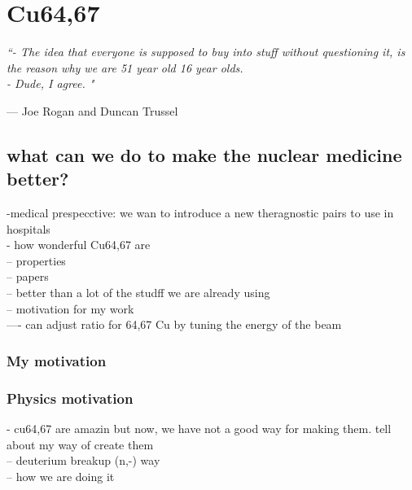 \documentclass[twoside,english]{uiofysmaster/uiofysmaster}
\begin{document}
\chapter{Cu64,67} 
\label{ch: mywork}

\epigraph{\itshape ``- The idea that everyone is supposed to buy into stuff without questioning it, is the reason why we are 51 year old 16 year olds.\\ 
- Dude, I agree. "}{--- \textup{Joe Rogan and Duncan Trussel}}


\section{what can we do to make the nuclear medicine better?}
\label{sec: betterwork}

-medical prespecctive: we wan to introduce a new theragnostic pairs to use in hospitals\\
- how wonderful Cu64,67 are\\
-- properties\\
-- papers\\
-- better than a lot of the studff we are already using\\
-- motivation for my work\\
---- can adjust ratio for 64,67 Cu by tuning the energy of the beam\\



\subsection{My motivation}
\label{sec: my_motivation}




\subsection{Physics motivation}
\label{sec: physics_motivation}

- cu64,67 are amazin but now, we have not a good way for making them. tell about my way of create them\\
-- deuterium breakup (n,-) way\\
-- how we are doing it\\



\end{document}
